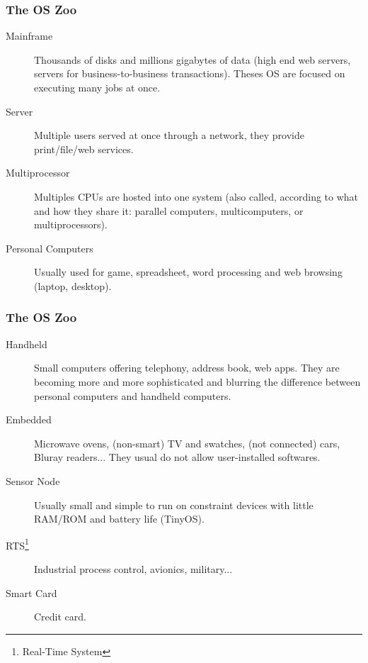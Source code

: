   \begin{frame}
    \frametitle{The OS Zoo}
        \begin{block}{}
          \begin{description}
            \item[Mainframe] Thousands of disks and millions gigabytes of data (high end web servers, servers for business-to-business transactions). Theses OS are focused on executing many jobs at once.
            \item[Server] Multiple users served at once through a network, they provide print/file/web services.
            \item[Multiprocessor] Multiples CPUs are hosted into one system (also called, according to what and how they share it: parallel computers, multicomputers, or multiprocessors).
            \item[Personal Computers] Usually used for game, spreadsheet, word processing and web browsing (laptop, desktop).
          \end{description}
        \end{block}
  \end{frame}
  \begin{frame}
    \frametitle{The OS Zoo}
        \begin{block}{}
          \begin{description}
            \item[Handheld] Small computers offering telephony, address book, web apps. They are becoming more and more sophisticated and blurring the difference between personal computers and handheld computers.
            \item[Embedded] Microwave ovens, (non-smart) TV and swatches, (not connected) cars, Bluray readers... They usual do not allow user-installed softwares.
            \item[Sensor Node] Usually small and simple to run on constraint devices with little RAM/ROM and battery life (TinyOS).
            \item[RTS\footnote{Real-Time System}] Industrial process control, avionics, military...
            \item[Smart Card] Credit card.
          \end{description}
        \end{block}
  \end{frame}

